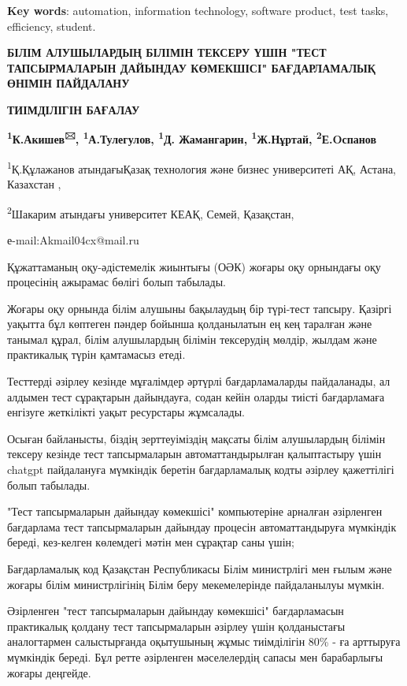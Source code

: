 {\bfseries Key words}: automation, information technology, software
product, test tasks, efficiency, student.

{\bfseries БІЛІМ АЛУШЫЛАРДЫҢ БІЛІМІН ТЕКСЕРУ ҮШІН "ТЕСТ ТАПСЫРМАЛАРЫН
ДАЙЫНДАУ КӨМЕКШІСІ" БАҒДАРЛАМАЛЫҚ ӨНІМІН ПАЙДАЛАНУ}

{\bfseries ТИІМДІЛІГІН БАҒАЛАУ}

{\bfseries \textsuperscript{1}К.Акишев\textsuperscript{🖂},
\textsuperscript{1}А.Тулегулов, \textsuperscript{1}Д. Жамангарин,
\textsuperscript{1}Ж.Нұртай, \textsuperscript{2}Е.Oспанов}

\textsuperscript{1}Қ.Құлажанов атындағыҚазақ технология және бизнес
университеті АҚ, Астана, Казахстан ,

\textsuperscript{2}Шакарим атындағы университет КЕАҚ, Семей, Қазақстан,

е-mail:Akmail04cx@mail.ru

Құжаттаманың оқу-әдістемелік жиынтығы (ОӘК) жоғары оқу орнындағы оқу
процесінің ажырамас бөлігі болып табылады.

Жоғары оқу орнында білім алушыны бақылаудың бір түрі-тест тапсыру.
Қазіргі уақытта бұл көптеген пәндер бойынша қолданылатын ең кең таралған
және танымал құрал, білім алушылардың білімін тексерудің мөлдір, жылдам
және практикалық түрін қамтамасыз етеді.

Тесттерді әзірлеу кезінде мұғалімдер әртүрлі бағдарламаларды
пайдаланады, ал алдымен тест сұрақтарын дайындауға, содан кейін оларды
тиісті бағдарламаға енгізуге жеткілікті уақыт ресурстары жұмсалады.

Осыған байланысты, біздің зерттеуіміздің мақсаты білім алушылардың
білімін тексеру кезінде тест тапсырмаларын автоматтандырылған
қалыптастыру үшін chatgpt пайдалануға мүмкіндік беретін бағдарламалық
кодты әзірлеу қажеттілігі болып табылады.

"Тест тапсырмаларын дайындау көмекшісі" компьютеріне арналған әзірленген
бағдарлама тест тапсырмаларын дайындау процесін автоматтандыруға
мүмкіндік береді, кез-келген көлемдегі мәтін мен сұрақтар саны үшін;

Бағдарламалық код Қазақстан Республикасы Білім министрлігі мен ғылым
және жоғары білім министрлігінің Білім беру мекемелерінде пайдаланылуы
мүмкін.

Әзірленген "тест тапсырмаларын дайындау көмекшісі" бағдарламасын
практикалық қолдану тест тапсырмаларын әзірлеу үшін қолданыстағы
аналогтармен салыстырғанда оқытушының жұмыс тиімділігін 80\% - ға
арттыруға мүмкіндік береді. Бұл ретте әзірленген мәселелердің сапасы мен
барабарлығы жоғары деңгейде.

